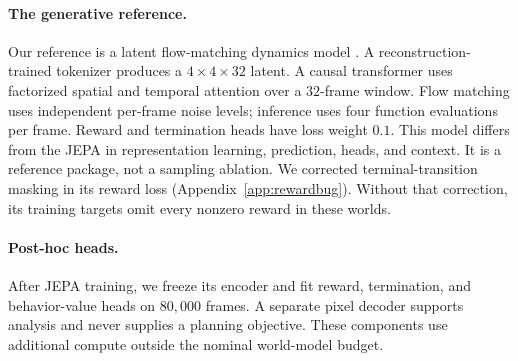\paragraph{The generative reference.}
Our reference is a latent flow-matching dynamics model \citep{lipman2023flowmatching,chen2024diffusionforcing,hafner2025dreamer4}.
A reconstruction-trained tokenizer produces a $4\times4\times32$ latent.
A causal transformer uses factorized spatial and temporal attention over a $32$-frame window.
Flow matching uses independent per-frame noise levels; inference uses four function evaluations per frame.
Reward and termination heads have loss weight $0.1$.
This model differs from the JEPA in representation learning, prediction, heads, and context.
It is a reference package, not a sampling ablation.
We corrected terminal-transition masking in its reward loss (Appendix~\ref{app:rewardbug}).
Without that correction, its training targets omit every nonzero reward in these worlds.

\paragraph{Post-hoc heads.}
After JEPA training, we freeze its encoder and fit reward, termination, and behavior-value heads on $80{,}000$ frames.
A separate pixel decoder supports analysis and never supplies a planning objective.
These components use additional compute outside the nominal world-model budget.

